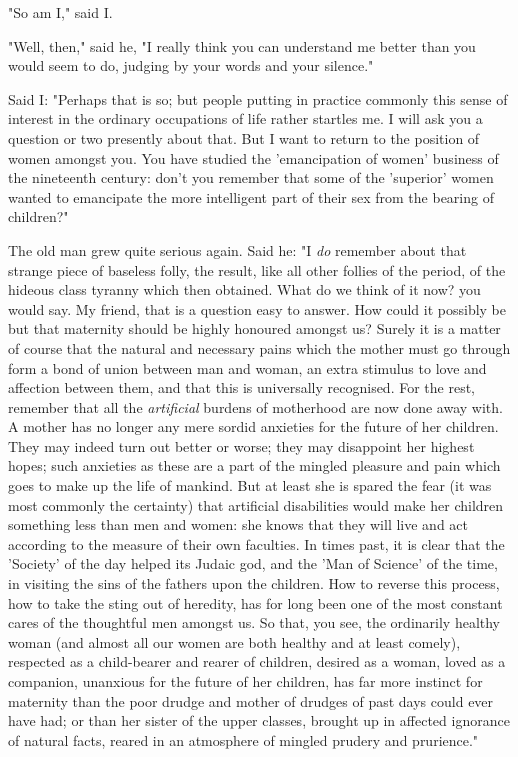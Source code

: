 "So am I," said I.

"Well, then," said he, "I really think you can understand me better than
you would seem to do, judging by your words and your silence."

Said I: "Perhaps that is so; but people putting in practice commonly
this sense of interest in the ordinary occupations of life rather
startles me. I will ask you a question or two presently about that. But
I want to return to the position of women amongst you. You have studied
the 'emancipation of women' business of the nineteenth century: don't
you remember that some of the 'superior' women wanted to emancipate the
more intelligent part of their sex from the bearing of children?"

The old man grew quite serious again. Said he: "I \emph{do} remember
about that strange piece of baseless folly, the result, like all other
follies of the period, of the hideous class tyranny which then obtained.
What do we think of it now? you would say. My friend, that is a question
easy to answer. How could it possibly be but that maternity should be
highly honoured amongst us? Surely it is a matter of course that the
natural and necessary pains which the mother must go through form a bond
of union between man and woman, an extra stimulus to love and affection
between them, and that this is universally recognised. For the rest,
remember that all the \emph{artificial} burdens of motherhood are now
done away with. A mother has no longer any mere sordid anxieties for the
future of her children. They may indeed turn out better or worse; they
may disappoint her highest hopes; such anxieties as these are a part of
the mingled pleasure and pain which goes to make up the life of mankind.
But at least she is spared the fear (it was most commonly the certainty)
that artificial disabilities would make her children something less than
men and women: she knows that they will live and act according to the
measure of their own faculties. In times past, it is clear that the
'Society' of the day helped its Judaic god, and the 'Man of Science' of
the time, in visiting the sins of the fathers upon the children. How to
reverse this process, how to take the sting out of heredity, has for
long been one of the most constant cares of the thoughtful men amongst
us. So that, you see, the ordinarily healthy woman (and almost all our
women are both healthy and at least comely), respected as a child-bearer
and rearer of children, desired as a woman, loved as a companion,
unanxious for the future of her children, has far more instinct for
maternity than the poor drudge and mother of drudges of past days could
ever have had; or than her sister of the upper classes, brought up in
affected ignorance of natural facts, reared in an atmosphere of mingled
prudery and prurience."

